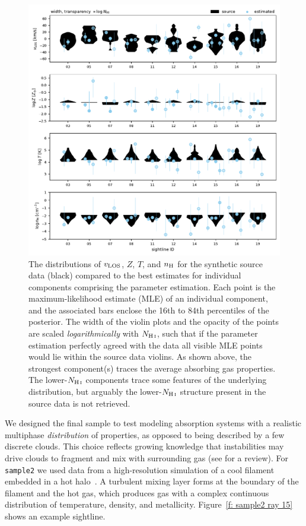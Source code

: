 \documentclass[fleqn,usenatbib]{mnras}
\begin{document}
\begin{figure}
    \centering
    \includegraphics[width=\textwidth]{figures/sample2/violin_vs_components_rerun.pdf}
    \caption{
    The distributions of $v_{\rm LOS}$, $Z$, $T$, and $n_{\rm H}$ for the synthetic source data (black) compared to the best estimates for individual components comprising the parameter estimation.
    Each point is the maximum-likelihood estimate (MLE) of an individual component,
    and the associated bars enclose the 16th to 84th percentiles of the posterior.
    The width of the violin plots and the opacity of the points are scaled \textit{logarithmically} with $N_{\ion{H}{I}}$,
    such that if the parameter estimation perfectly agreed with the data all visible MLE points would lie within the source data violins.
    As shown above, the strongest component(s) traces the average absorbing gas properties.
    The lower-$N_{\ion{H}{I}}$ components trace some features of the underlying distribution,
    but arguably the lower-$N_{\ion{H}{I}}$ structure present in the source data is not retrieved.
    }
    \label{f: sample2 violin vs components}
\end{figure}

We designed the final sample to test modeling absorption systems with a realistic multiphase \textit{distribution} of properties, as opposed to being described by a few discrete clouds.
This choice reflects growing knowledge that instabilities may drive clouds to fragment and mix with surrounding gas (see \citealt{faucher-giguere2023Key} for a review).
For \texttt{sample2} we used data from a high-resolution simulation of a cool filament embedded in a hot halo~\citep{mandelker2020Instability}.
A turbulent mixing layer forms at the boundary of the filament and the hot gas, which produces gas with a complex continuous distribution of temperature, density, and metallicity.
Figure~\ref{f: sample2 ray 15} shows an example sightline.
\end{document}
